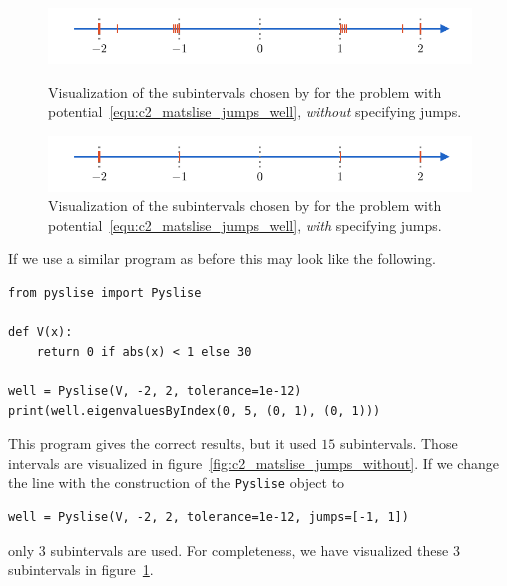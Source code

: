 \begin{figure}
    \begin{center}
        \includegraphics[width=\textwidth]{img/chapter2/matslise_jumps_without.pdf}
    \end{center}
    \caption{Visualization of the subintervals chosen by  for the problem with potential~\eqref{equ:c2_matslise_jumps_well}, \emph{without} specifying jumps.}
    \label{fig:c2_matslise_jumps_without}
    \vspace{8mm}
    \begin{center}
        \includegraphics[width=\textwidth]{img/chapter2/matslise_jumps_with.pdf}
    \end{center}
    \caption{Visualization of the subintervals chosen by  for the problem with potential~\eqref{equ:c2_matslise_jumps_well}, \emph{with} specifying jumps.}
    \label{fig:c2_matslise_jumps_with}
\end{figure}

If we use a similar program as before this may look like the following.
\begin{verbatim}
from pyslise import Pyslise

def V(x):
    return 0 if abs(x) < 1 else 30

well = Pyslise(V, -2, 2, tolerance=1e-12)
print(well.eigenvaluesByIndex(0, 5, (0, 1), (0, 1)))
\end{verbatim}
This program gives the correct results, but it used $15$ subintervals. Those intervals are visualized in figure~\ref{fig:c2_matslise_jumps_without}. If we change the line with the construction of the \texttt{Pyslise} object to
\begin{verbatim}
well = Pyslise(V, -2, 2, tolerance=1e-12, jumps=[-1, 1])
\end{verbatim}
only $3$ subintervals are used. For completeness, we have visualized these 3 subintervals in figure~\ref{fig:c2_matslise_jumps_with}.

